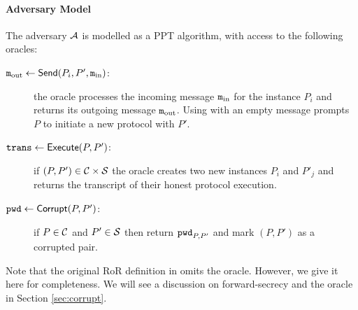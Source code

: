 
\paragraph{Adversary Model}
The adversary $\mathcal{A}$ is modelled as a \ac{PPT} algorithm, with access to the following oracles:
\begin{description}
    \item[$\mathtt{m}_{\mathrm{out}}\gets\mathsf{Send}(P_i,P',\mathtt{m}_{\mathrm{in}})$:] the oracle processes the incoming message $\mathtt{m}_{\mathrm{in}}$ for the instance $P_i$ and returns its outgoing message $\mathtt{m}_{\mathrm{out}}$.
    	Using \Send with an empty message prompts $P$ to initiate a new protocol with $P'$.
    \item[$\mathtt{trans}\gets\mathsf{Execute}(P,P')$:] if $(P,P')\in\mathcal{C}\times\mathcal{S}$ the oracle creates two new instances $P_i$ and $P'_j$ and returns the transcript \trans of their honest protocol execution.
    \item[$\mathtt{pwd}\gets\mathsf{Corrupt}(P, P')$:] if $P\in\mathcal{C}$ and $P'\in\mathcal{S}$ then return $\mathtt{pwd}_{P,P'}$ and mark $(P,P')$ as a corrupted pair.
\end{description}

\noindent
Note that the original \ac{RoR} definition in \cite{Abdalla2005} omits the \Corrupt oracle.
However, we give it here for completeness.
We will see a discussion on forward-secrecy and the \Corrupt oracle in Section \ref{sec:corrupt}.

